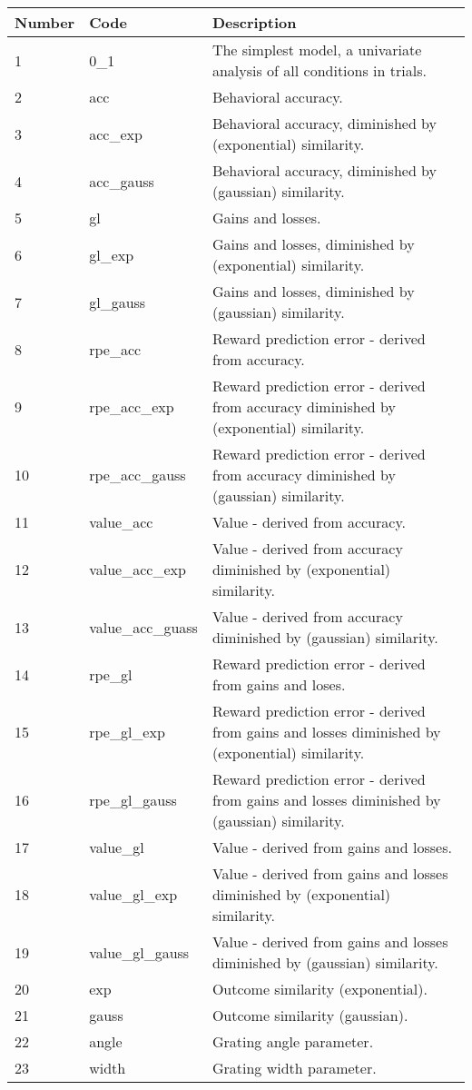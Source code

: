 \begin{center}
    \begin{tabular}{ | l | l | p{4cm} |}
    \hline
    Number & Code & Description \\ \hline
    1 & 0\_1 & The simplest model, a univariate analysis of all conditions in trials. \\ \hline
    2 & acc & Behavioral accuracy. \\ \hline
    3 & acc\_exp & Behavioral accuracy, diminished by (exponential) similarity. \\ \hline
    4 & acc\_gauss & Behavioral accuracy, diminished by (gaussian) similarity. \\ \hline
    5 & gl & Gains and losses. \\ \hline 
    6 & gl\_exp & Gains and losses, diminished by (exponential) similarity. \\ \hline
    7 & gl\_gauss & Gains and losses, diminished by (gaussian) similarity. \\ \hline
    8 & rpe\_acc & Reward prediction error - derived from accuracy. \\ \hline
    9 & rpe\_acc\_exp & Reward prediction error - derived from accuracy diminished by (exponential) similarity. \\ \hline
    10 & rpe\_acc\_gauss & Reward prediction error - derived from accuracy diminished by (gaussian) similarity. \\ \hline
    11 & value\_acc & Value - derived from accuracy. \\ \hline
    12 & value\_acc\_exp & Value - derived from accuracy diminished by (exponential) similarity. \\ \hline
    13 & value\_acc\_guass & Value - derived from accuracy diminished by (gaussian) similarity. \\ \hline
    14 & rpe\_gl & Reward prediction error - derived from gains and loses. \\ \hline
    15 & rpe\_gl\_exp & Reward prediction error - derived from gains and losses diminished by (exponential) similarity. \\ \hline
    16 & rpe\_gl\_gauss & Reward prediction error - derived from gains and losses diminished by (gaussian) similarity. \\ \hline
    17 & value\_gl & Value - derived from gains and losses. \\ \hline
    18 & value\_gl\_exp & Value - derived from gains and losses diminished by (exponential) similarity. \\ \hline
    19 & value\_gl\_gauss & Value - derived from gains and losses diminished by (gaussian) similarity. \\ \hline 
    20 & exp & Outcome similarity (exponential). \\ \hline
    21 & gauss & Outcome similarity (gaussian). \\ \hline
    22 & angle & Grating angle parameter. \\ \hline
    23 &width & Grating width parameter. \\ \hline
\end{tabular}
\end{center}


